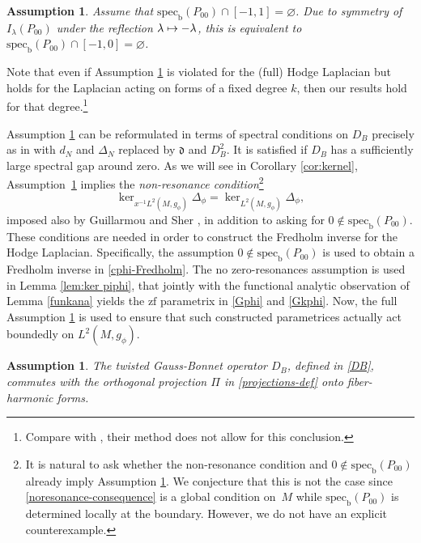 \documentclass[JEP,XML,SOM,Unicode,NoFloatCountersInSection,published]{cedram}
\newcommand\mto{\mathchoice{\longmapsto}{\mapsto}{\mapsto}{\mapsto}}
\theoremstyle{plain}
\newtheorem{assum}[Th]{Assumption}
\theoremstyle{definition}
\newcommand{\bb}{{\mathrm{b}}}
\newcommand{\zf}{{\mathrm{zf}}}
\newcommand{\specb}{\mathrm{spec}_\bb}
\begin{document}
\begin{assum}\label{assum3}
Assume that $\specb(P_{00}) \cap[-1,1]=\varnothing$.
Due to symmetry of $I_\lambda(P_{00})$ under the reflection
$\lambda \mto - \lambda$, this is equivalent to $\specb(P_{00}) \cap[-1,0]=\varnothing$.
\end{assum}

Note that even if Assumption \ref{assum3} is violated for the (full) Hodge Laplacian but holds for
the Laplacian acting on forms of a fixed degree $k$, then our results hold for that degree.\footnote{Compare with \cite{kottke-rochon}, their method does not allow for this conclusion.}

Assumption \ref{assum3} can be reformulated in terms of spectral
conditions on $D_B$ precisely as in \cite[(21)]{guillarmou2014low}
with $d_N$ and $\Delta_N$ replaced by $\mathfrak{d}$ and $D^2_B$. It is satisfied if $D_B$ has a sufficiently large spectral gap around zero.
As we will see in Corollary \ref{cor:kernel}, Assumption~\ref{assum3} implies the \textit{non-resonance condition}\footnote{It is natural to ask whether the non-resonance condition and $0 \notin \specb(P_{00})$ already imply Assumption \ref{assum3}. We conjecture that this is not the case since \eqref{noresonance-consequence} is a global condition on~$M$ while $\specb(P_{00})$ is determined locally at the boundary. However, we do not have an explicit counterexample.}
\begin{equation}\label{noresonance-consequence}
\ker_{x^{-1}L^{2}(M,g_\phi) }\Delta_{\phi} = \ker_{L^{2}(M,g_\phi)}\Delta_{\phi},
\end{equation}
imposed also by Guillarmou and Sher \cite{guillarmou2014low}, in addition to asking for
$0 \notin \specb(P_{00})$. These conditions are needed in order to construct the Fredholm
inverse for the Hodge Laplacian. Specifically, the assumption $0 \notin \specb(P_{00})$
is used to obtain a Fredholm inverse in \eqref{cphi-Fredholm}.
The no zero-resonances assumption is used in Lemma \ref{lem:ker piphi}, that jointly with the functional
analytic observation of Lemma \ref{funkana} yields the $\zf$ parametrix in \eqref{Gphi}
and \eqref{Gkphi}. Now, the full Assumption \ref{assum3} is used to ensure that
such constructed parametrices actually act boundedly on $L^2(M,g_\phi)$.

\begin{assum}\label{assum4}
The twisted Gauss-Bonnet operator $D_B$, defined in \eqref{DB}, commutes with the orthogonal
projection $\Pi$ in \eqref{projections-def} onto fiber-harmonic forms.
\end{assum}
\end{document}
